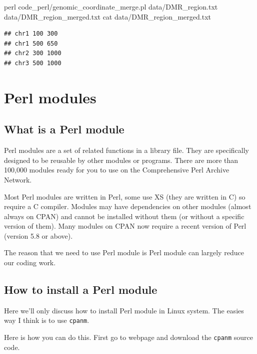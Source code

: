 \documentclass[]{book}
\makeatletter
\newenvironment{Shaded}{\begin{snugshade}}{\end{snugshade}}
\newcommand{\FunctionTok}[1]{\textcolor[rgb]{0.00,0.00,0.00}{#1}}
\newcommand{\NormalTok}[1]{#1}
\newenvironment{kframe}{%
\medskip{}
\setlength{\fboxsep}{.8em}
 \def\at@end@of@kframe{}%
 \ifinner\ifhmode%
  \def\at@end@of@kframe{\end{minipage}}%
  \begin{minipage}{\columnwidth}%
 \fi\fi%
 \def\FrameCommand##1{\hskip\@totalleftmargin \hskip-\fboxsep
 \colorbox{shadecolor}{##1}\hskip-\fboxsep
     \hskip-\linewidth \hskip-\@totalleftmargin \hskip\columnwidth}%
 \MakeFramed {\advance\hsize-\width
   \@totalleftmargin\z@ \linewidth\hsize
   \@setminipage}}%
 {\par\unskip\endMakeFramed%
 \at@end@of@kframe}
\renewenvironment{Shaded}{\begin{kframe}}{\end{kframe}}
\makeatother
\begin{document}
\begin{Shaded}
\begin{Highlighting}[]
\FunctionTok{perl}\NormalTok{ code_perl/genomic_coordinate_merge.pl  data/DMR_region.txt  data/DMR_region_merged.txt }
\FunctionTok{cat}\NormalTok{ data/DMR_region_merged.txt }
\end{Highlighting}
\end{Shaded}

\begin{verbatim}
## chr1 100 300
## chr1 500 650
## chr2 300 1000
## chr3 500 1000
\end{verbatim}

\hypertarget{perl-modules}{%
\chapter{Perl modules}\label{perl-modules}}

\hypertarget{what-is-a-perl-module}{%
\section{What is a Perl module}\label{what-is-a-perl-module}}

Perl modules are a set of related functions in a library file. They are specifically designed to be reusable by other modules or programs. There are more than 100,000 modules ready for you to use on the Comprehensive Perl Archive Network.

Most Perl modules are written in Perl, some use XS (they are written in C) so require a C compiler. Modules may have dependencies on other modules (almost always on CPAN) and cannot be installed without them (or without a specific version of them). Many modules on CPAN now require a recent version of Perl (version 5.8 or above).

The reason that we need to use Perl module is Perl module can largely reduce our coding work.

\hypertarget{how-to-install-a-perl-module}{%
\section{How to install a Perl module}\label{how-to-install-a-perl-module}}

Here we'll only discuss how to install Perl module in Linux system. The easies way I think is to use \texttt{cpanm}.

Here is how you can do this. First go to webpage and download the \texttt{cpanm} source code.
\end{document}
